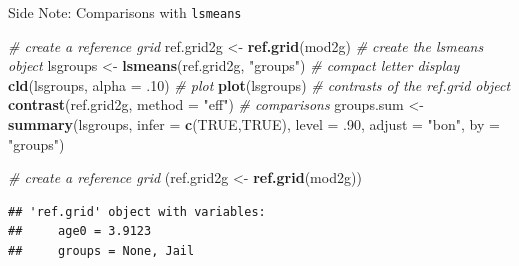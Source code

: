 \documentclass[ignorenonframetext,]{beamer}
\newenvironment{Shaded}{\begin{snugshade}}{\end{snugshade}}
\newcommand{\KeywordTok}[1]{\textcolor[rgb]{0.13,0.29,0.53}{\textbf{{#1}}}}
\newcommand{\DataTypeTok}[1]{\textcolor[rgb]{0.13,0.29,0.53}{{#1}}}
\newcommand{\DecValTok}[1]{\textcolor[rgb]{0.00,0.00,0.81}{{#1}}}
\newcommand{\StringTok}[1]{\textcolor[rgb]{0.31,0.60,0.02}{{#1}}}
\newcommand{\CommentTok}[1]{\textcolor[rgb]{0.56,0.35,0.01}{\textit{{#1}}}}
\newcommand{\OtherTok}[1]{\textcolor[rgb]{0.56,0.35,0.01}{{#1}}}
\newcommand{\NormalTok}[1]{{#1}}
\begin{document}
\begin{frame}[fragile]{Side Note: Comparisons with \texttt{lsmeans}}

\footnotesize

\begin{Shaded}
\begin{Highlighting}[]
\CommentTok{# create a reference grid}
\NormalTok{ref.grid2g <-}\StringTok{ }\KeywordTok{ref.grid}\NormalTok{(mod2g)}
\CommentTok{# create the lsmeans object}
\NormalTok{lsgroups   <-}\StringTok{ }\KeywordTok{lsmeans}\NormalTok{(ref.grid2g, }\StringTok{"groups"}\NormalTok{)}
\CommentTok{# compact letter display}
\KeywordTok{cld}\NormalTok{(lsgroups, }\DataTypeTok{alpha =} \NormalTok{.}\DecValTok{10}\NormalTok{)}
\CommentTok{# plot}
\KeywordTok{plot}\NormalTok{(lsgroups)}
\CommentTok{# contrasts of the ref.grid object}
\KeywordTok{contrast}\NormalTok{(ref.grid2g, }\DataTypeTok{method =} \StringTok{"eff"}\NormalTok{)}
\CommentTok{# comparisons}
\NormalTok{groups.sum <-}\StringTok{ }\KeywordTok{summary}\NormalTok{(lsgroups, }\DataTypeTok{infer =} \KeywordTok{c}\NormalTok{(}\OtherTok{TRUE}\NormalTok{,}\OtherTok{TRUE}\NormalTok{), }
                      \DataTypeTok{level =} \NormalTok{.}\DecValTok{90}\NormalTok{, }\DataTypeTok{adjust =} \StringTok{"bon"}\NormalTok{, }\DataTypeTok{by =} \StringTok{"groups"}\NormalTok{)}
\end{Highlighting}
\end{Shaded}

\end{frame}

\begin{frame}[fragile]

\begin{Shaded}
\begin{Highlighting}[]
\CommentTok{# create a reference grid}
\NormalTok{(ref.grid2g <-}\StringTok{ }\KeywordTok{ref.grid}\NormalTok{(mod2g))}
\end{Highlighting}
\end{Shaded}

\begin{verbatim}
## 'ref.grid' object with variables:
##     age0 = 3.9123
##     groups = None, Jail
\end{verbatim}

\end{frame}
\end{document}
